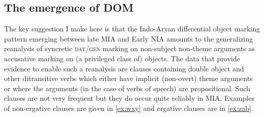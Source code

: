 \documentclass[output=paper,
modfonts
]{LSP/langsci}
\begin{document}
\subsection{The emergence of DOM} 
The key suggestion I make here is that the Indo-Aryan differential object marking pattern emerging between late MIA and Early NIA amounts to the generalizing reanalysis of  syncretic \textsc{dat/gen} marking on non-subject non-theme arguments  as accusative marking on (a privileged class of) objects. The data that provide evidence to enable such a reanalysis are clauses containing  double object and other ditransitive verbs which either have implicit (non-overt) theme arguments or where the arguments (in the case of verbs of speech) are propositional. Such clauses are not very frequent but they do occur  quite reliably in MIA. Examples of non-ergative clauses are given  in  \cref{ex:wxy} and ergative clauses are in \cref{ex:zab}. 
\end{document}
